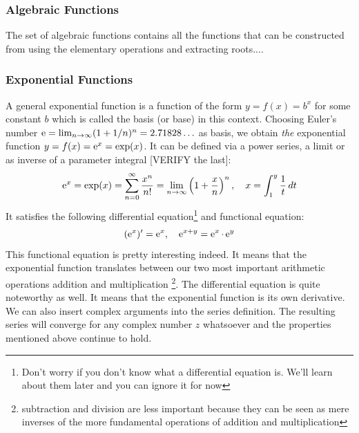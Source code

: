 \subsubsection{Algebraic Functions}
The set of algebraic functions contains all the functions that can be constructed from using the elementary operations and extracting roots....








\subsubsection{Exponential Functions}
A general exponential function is a function of the form $y = f(x) = b^x$ for some constant $b$ which is called the basis (or base) in this context. Choosing Euler's number $\operatorname{\mathrm{e}} = \lim_{n \rightarrow \infty} (1 + 1/n)^n = 2.71828\ldots$ as basis, we obtain \emph{the} exponential function $y = f(x) = \operatorname{\mathrm{e}}^x = \exp(x)$. It can be defined via a power series, a limit or as inverse of a parameter integral [VERIFY the last]:
\begin{equation}
\operatorname{\mathrm{e}}^x 
= \exp(x)
= \sum_{n=0}^{\infty} \frac{x^n}{n!}
= \lim_{n \rightarrow \infty} \left( 1 + \frac{x}{n} \right)^n, \quad
x = \int_1^y \frac{1}{t} \, dt
\end{equation}
It satisfies the following differential equation\footnote{Don't worry if you don't know what a differential equation is. We'll learn about them later and you can ignore it for now} and functional equation:
\begin{equation}
(\operatorname{\mathrm{e}}^x)' = \operatorname{\mathrm{e}}^x, \quad
\operatorname{\mathrm{e}}^{x+y} = \operatorname{\mathrm{e}}^x \cdot \operatorname{\mathrm{e}}^y
\end{equation}
This functional equation is pretty interesting indeed. It means that the exponential function translates between our two most important arithmetic operations addition and multiplication \footnote{subtraction and division are less important because they can be seen as mere inverses of the more fundamental operations of addition and multiplication}. The differential equation is quite noteworthy as well. It means that the exponential function is its own derivative. We can also insert complex arguments into the series definition. The resulting series will converge for any complex number $z$ whatsoever and the properties mentioned above continue to hold.

